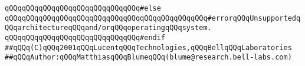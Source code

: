 \verb|qQQqqQQqqQQqqQQqqQQqqQQqqQQqqQQq#else|\newline
\newline
\verb|qQQqqQQqqQQqqQQqqQQqqQQqqQQqqQQqqQQqqQQqqQQqqQQq#errorqQQqUnsupportedqQQqarchitectureqQQqand/orqQQqoperatingqQQqsystem.|\newline
\newline
\verb|qQQqqQQqqQQqqQQqqQQqqQQqqQQqqQQq#endif|\newline
\newline
\newline
\verb|##qQQq(C)qQQq2001qQQqLucentqQQqTechnologies,qQQqBellqQQqLaboratories|\newline
\verb|##qQQqAuthor:qQQqMatthiasqQQqBlumeqQQq(blume@research.bell-labs.com)|\newline


